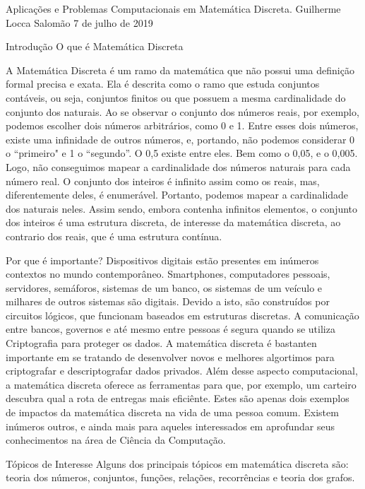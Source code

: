 Aplicações e Problemas Computacionais em Matemática Discreta.
Guilherme Locca Salomão
7 de julho de 2019

Introdução
    O que é Matemática Discreta

        A Matemática Discreta é um ramo da matemática que não possui uma definição formal precisa e exata. Ela é descrita como o ramo que estuda conjuntos contáveis, ou seja, conjuntos finitos ou que possuem a mesma cardinalidade do conjunto dos naturais.
        Ao se observar o conjunto dos números reais, por exemplo, podemos escolher dois números arbitrários, como 0 e 1. Entre esses dois números, existe uma infinidade de outros números, e, portando, não podemos considerar 0 o “primeiro" e 1 o “segundo”. O 0,5 existe entre eles. Bem como o 0,05, e o 0,005. Logo, não conseguimos mapear a cardinalidade dos números naturais para cada número real.
        O conjunto dos inteiros é infinito assim como os reais, mas, diferentemente deles, é enumerável. Portanto, podemos mapear a cardinalidade dos naturais neles. 
        Assim sendo, embora contenha infinitos elementos, o conjunto dos inteiros é uma estrutura discreta, de interesse da matemática discreta, ao contrario dos reais, que é uma estrutura contínua.


    Por que é importante?
        Dispositivos digitais estão presentes em inúmeros contextos no mundo contemporâneo. Smartphones, computadores pessoais, servidores, semáforos, sistemas de um banco, os sistemas de um veículo e milhares de outros sistemas são digitais. Devido a isto, são construídos por circuitos lógicos, que funcionam baseados em estruturas discretas.
        A comunicação entre bancos, governos e até mesmo entre pessoas é segura quando se utiliza Criptografia para proteger os dados. A matemática discreta é bastanten importante em se tratando de desenvolver novos e melhores algortimos para criptografar e descriptografar dados privados.
        Além desse aspecto computacional, a matemática discreta oferece as ferramentas para que, por exemplo, um carteiro descubra qual a rota de entregas mais eficiênte.
        Estes são apenas dois exemplos de impactos da matemática discreta na vida de uma pessoa comum. Existem inúmeros outros, e ainda mais para aqueles interessados em aprofundar seus conhecimentos na área de Ciência da Computação.


    Tópicos de Interesse
        Alguns dos principais tópicos em matemática discreta são: teoria dos números, conjuntos, funções, relações, recorrências e teoria dos grafos.

